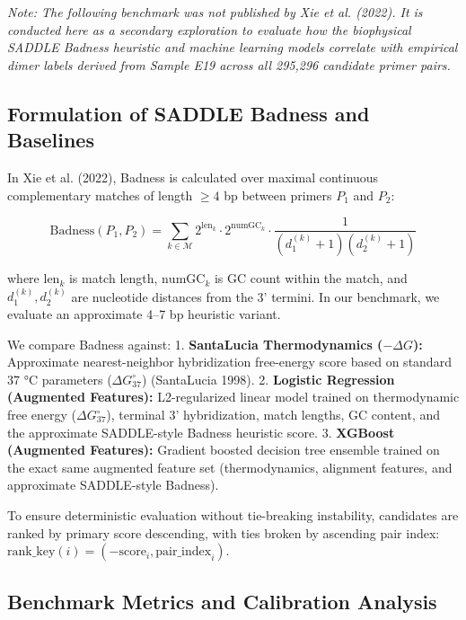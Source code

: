 \documentclass[
]{article}
\begin{document}
\emph{Note: The following benchmark was not published by Xie et al.
(2022). It is conducted here as a secondary exploration to evaluate how
the biophysical SADDLE Badness heuristic and machine learning models
correlate with empirical dimer labels derived from Sample E19 across all
295,296 candidate primer pairs.}

\subsection{Formulation of SADDLE Badness and
Baselines}\label{formulation-of-saddle-badness-and-baselines}

In Xie et al. (2022), Badness is calculated over maximal continuous
complementary matches of length \(\ge 4\) bp between primers \(P_1\) and
\(P_2\):

\[\text{Badness}(P_1, P_2) = \sum_{k \in \mathcal{M}} 2^{\text{len}_k} \cdot 2^{\text{numGC}_k} \cdot \frac{1}{(d_1^{(k)} + 1)(d_2^{(k)} + 1)}\]

where \(\text{len}_k\) is match length, \(\text{numGC}_k\) is GC count
within the match, and \(d_1^{(k)}, d_2^{(k)}\) are nucleotide distances
from the 3' termini. In our benchmark, we evaluate an approximate 4--7
bp heuristic variant.

We compare Badness against: 1. \textbf{SantaLucia Thermodynamics
(\(-\Delta G\)):} Approximate nearest-neighbor hybridization free-energy
score based on standard 37 °C parameters (\(\Delta G_{37}^\circ\))
(SantaLucia 1998). 2. \textbf{Logistic Regression (Augmented Features):}
L2-regularized linear model trained on thermodynamic free energy
(\(\Delta G_{37}^\circ\)), terminal 3' hybridization, match lengths, GC
content, and the approximate SADDLE-style Badness heuristic score. 3.
\textbf{XGBoost (Augmented Features):} Gradient boosted decision tree
ensemble trained on the exact same augmented feature set
(thermodynamics, alignment features, and approximate SADDLE-style
Badness).

To ensure deterministic evaluation without tie-breaking instability,
candidates are ranked by primary score descending, with ties broken by
ascending pair index:
\(\text{rank\_key}(i) = (-\text{score}_i, \text{pair\_index}_i)\).

\subsection{Benchmark Metrics and Calibration
Analysis}\label{benchmark-metrics-and-calibration-analysis}
\end{document}
